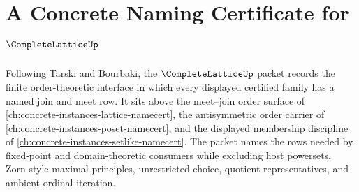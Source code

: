 \chapter{A Concrete Naming Certificate for $\CompleteLatticeUp$}
\label{ch:concrete-instances-complete-lattice-namecert}

Following Tarski and Bourbaki, the $\CompleteLatticeUp$ packet records the finite order-theoretic interface in which every displayed certified family has a named join and meet row. It sits above the meet--join order surface of \autoref{ch:concrete-instances-lattice-namecert}, the antisymmetric order carrier of \autoref{ch:concrete-instances-poset-namecert}, and the displayed membership discipline of \autoref{ch:concrete-instances-setlike-namecert}. The packet names the rows needed by fixed-point and domain-theoretic consumers while excluding host powersets, Zorn-style maximal principles, unrestricted choice, quotient representatives, and ambient ordinal iteration.

